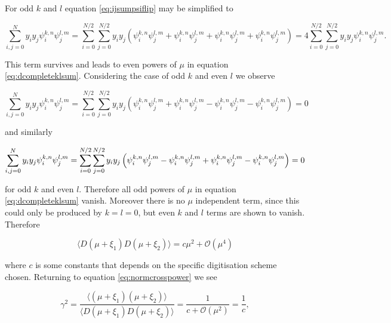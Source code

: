 \documentclass[a4paper,fleqn,usenatbib]{mnras}
\begin{document}
For odd $k$ and $l$ equation \ref{eq:ijsumpsiflip} may be simplified to

\begin{equation}
\sum_{i,j = 0}^N y_i y_j \psi_i^{k, n} \psi_j^{l, m} = \sum_{i = 0}^{N/2}\sum_{j = 0}^{N/2} y_i y_j \left( \psi_i^{k, n} \psi_j^{l, m} + \psi_{i}^{k, n} \psi_j^{l, m} + \psi_i^{k, n} \psi_{j}^{l, m} + \psi_{i}^{k, n} \psi_{j}^{l, m} \right) = 4 \sum_{i = 0}^{N/2}\sum_{j = 0}^{N/2} y_i y_j \psi_i^{k, n} \psi_j^{l, m}.
\end{equation}

This term survives and leads to even powers of $\mu$ in equation \ref{eq:dcompleteklsum}. Considering the case of odd $k$ and even $l$ we observe

\begin{equation}
\sum_{i,j = 0}^N y_i y_j \psi_i^{k, n} \psi_j^{l, m} = \sum_{i = 0}^{N/2}\sum_{j = 0}^{N/2} y_i y_j \left( \psi_i^{k, n} \psi_j^{l, m} + \psi_{i}^{k, n} \psi_j^{l, m} - \psi_i^{k, n} \psi_{j}^{l, m} - \psi_{i}^{k, n} \psi_{j}^{l, m} \right) = 0
\end{equation}

and similarly

\begin{equation}
\sum_{i,j = 0}^N y_i y_j \psi_i^{k, n} \psi_j^{l, m} = \sum_{i = 0}^{N/2}\sum_{j = 0}^{N/2} y_i y_j \left( \psi_i^{k, n} \psi_j^{l, m} - \psi_{i}^{k, n} \psi_j^{l, m} + \psi_i^{k, n} \psi_{j}^{l, m} - \psi_{i}^{k, n} \psi_{j}^{l, m} \right) = 0\\
\end{equation}

for odd $k$ and even $l$. Therefore all odd powers of $\mu$ in equation \ref{eq:dcompleteklsum} vanish. Moreover there is no $\mu$ independent term, since this could only be produced by $k=l=0$, but even $k$ and $l$ terms are shown to vanish. Therefore

\begin{equation}
\langle D(\mu + \xi_1) D(\mu + \xi_2) \rangle = c \mu^2 + \mathcal{O}(\mu^4)
\end{equation}

where $c$ is some constants that depends on the specific digitisation scheme chosen. Returning to equation \ref{eq:normcrosspower} we see

\begin{equation}
\gamma^2  = \frac{\langle (\mu + \xi_1) (\mu + \xi_2) \rangle}{\langle D(\mu + \xi_1) D(\mu + \xi_2) \rangle} = \frac{1}{c + \mathcal{O}(\mu^2)} = \frac{1}{c},
\end{equation}
\end{document}
